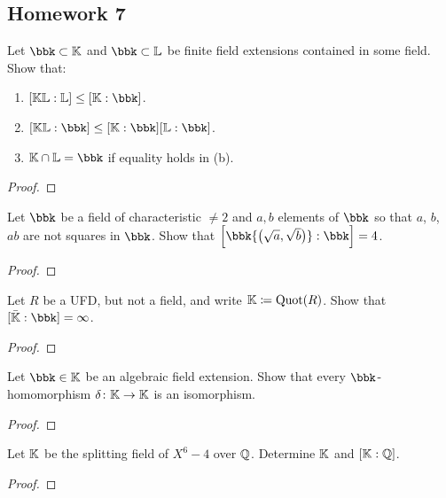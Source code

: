 \subsection{Homework 7}
\begin{problem}
  Let $\bbk\subset\bbK$ and $\bbk\subset\bbL$ be finite field extensions
  contained in some field. Show that:
  \begin{enumerate}[label=(\alph*),noitemsep]
  \item $[\bbK\bbL:\bbL]\leq [\bbK:\bbk]$.
  \item $[\bbK\bbL:\bbk]\leq[\bbK:\bbk][\bbL:\bbk]$.
  \item $\bbK\cap\bbL=\bbk$ if equality holds in (b).
  \end{enumerate}
\end{problem}
\begin{proof}
\end{proof}

\begin{problem}
  Let $\bbk$ be a field of characteristic $\neq 2$ and $a,b$ elements of
  $\bbk$ so that $a$, $b$, $ab$ are not squares in $\bbk$. Show that
  $\left[\bbk{\bigl(\sqrt{a},\sqrt{b}\bigr)}:\bbk\right]=4$.
\end{problem}
\begin{proof}
\end{proof}

\begin{problem}
  Let $R$ be a UFD, but not a field, and write $\mathbb{K}\coloneq\operatorname{Quot}(R)$. Show
  that $[\bar\bbK:\bbk]=\infty$.
\end{problem}
\begin{proof}
\end{proof}

\begin{problem}
  Let $\bbk\in\bbK$ be an algebraic field extension. Show that every
  $\bbk$-homomorphism $\delta\colon\mathbb{K}\to\mathbb{K}$ is an isomorphism.
\end{problem}
\begin{proof}
\end{proof}

\begin{problem}
  Let $\mathbb{K}$ be the splitting field of $X^6-4$ over $\mathbb{Q}$. Determine
  $\mathbb{K}$ and $[\mathbb{K}:\mathbb{Q}]$.
\end{problem}
\begin{proof}
\end{proof}

